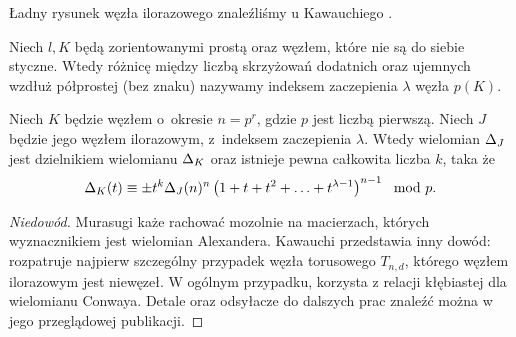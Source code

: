 Ładny rysunek węzła ilorazowego znaleźliśmy u Kawauchiego \cite[s. 122]{kawauchi1996}.

\begin{definition}
    Niech $l, K$ będą zorientowanymi prostą oraz węzłem, które nie są do siebie styczne.
    Wtedy różnicę między liczbą skrzyżowań dodatnich oraz ujemnych wzdłuż półprostej (bez znaku) nazywamy indeksem zaczepienia $\lambda$ węzła $p(K)$.
\end{definition}

\begin{proposition}
%
\label{prp:murasugi_periodic}%
    Niech $K$ będzie węzłem o~okresie $n = p^r$, gdzie $p$ jest liczbą pierwszą.
    Niech $J$ będzie jego węzłem ilorazowym, z~indeksem zaczepienia $\lambda$.
    Wtedy wielomian $\Delta_J$ jest dzielnikiem wielomianu $\Delta_K$ oraz istnieje pewna całkowita liczba $k$, taka że
    \begin{equation}
        \Delta_K(t) \equiv \pm t^k \Delta_J(n)^n \left(1 + t + t^2 + \ldots + t^{\lambda - 1}\right)^{n-1} \mod p.
    \end{equation}
\end{proposition}

\begin{proof}[Niedowód]
    Murasugi \cite{murasugi1971} każe rachować mozolnie na macierzach, których wyznacznikiem jest wielomian Alexandera.
    Kawauchi \cite[s. 122-124]{kawauchi1996} przedstawia inny dowód: rozpatruje najpierw szczególny przypadek węzła torusowego $T_{n, d}$, którego węzłem ilorazowym jest niewęzeł.
    W ogólnym przypadku, korzysta z relacji kłębiastej dla wielomianu Conwaya.
    Detale oraz odsyłacze do dalszych prac znaleźć można w jego przeglądowej publikacji.
\end{proof}

